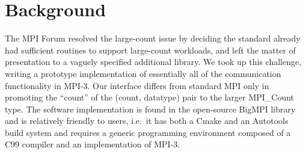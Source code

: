 
\section{Background}

The MPI Forum resolved the large-count issue by deciding the standard already
had sufficient routines to support large-count workloads, and left the matter
of presentation to a vaguely specified additional library.  We took up this
challenge, writing a prototype implementation of
essentially all of the communication functionality in MPI-3.  Our interface
differs from standard MPI only in promoting the ``count'' of the (count,
datatype) pair to the larger MPI\_Count type.  The software implementation is
found in the open-source BigMPI
library and is relatively friendly to users, i.e.\ it has both a Cmake
and an Autotools build system and requires a generic programming
environment composed of a C99 compiler and an implementation
of MPI-3.
